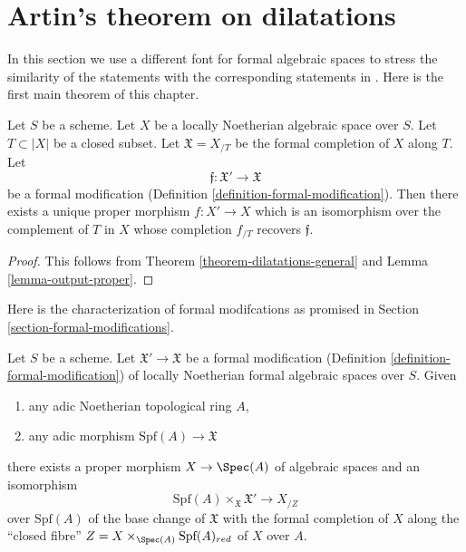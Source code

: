 \section{Artin's theorem on dilatations}
\label{section-dilatations}

\noindent
In this section we use a different font for formal algebraic spaces
to stress the similarity of the statements with the corresponding
statements in \cite{ArtinII}. Here is the first main theorem of this chapter.

\begin{theorem}
\label{theorem-dilatations}
\begin{reference}
\cite[Theorem 3.1]{ArtinII}
\end{reference}
Let $S$ be a scheme. Let $X$ be a locally Noetherian algebraic space over $S$.
Let $T \subset |X|$ be a closed subset. Let
$\mathfrak X = X_{/T}$
be the formal completion of $X$ along $T$. Let
$$
\mathfrak f : \mathfrak X' \to \mathfrak X
$$
be a formal modification (Definition \ref{definition-formal-modification}).
Then there exists a unique proper morphism $f : X' \to X$ which is an
isomorphism over the complement of $T$ in $X$ whose completion $f_{/T}$
recovers $\mathfrak f$. 
\end{theorem}

\begin{proof}
This follows from Theorem \ref{theorem-dilatations-general}
and Lemma \ref{lemma-output-proper}.
\end{proof}

\noindent
Here is the characterization of formal modifcations
as promised in Section \ref{section-formal-modifications}.

\begin{lemma}
\label{lemma-formal-modifications-locally-algebraic}
Let $S$ be a scheme. Let $\mathfrak X' \to \mathfrak X$
be a formal modification (Definition \ref{definition-formal-modification})
of locally Noetherian formal algebraic spaces over $S$. Given
\begin{enumerate}
\item any adic Noetherian topological ring $A$,
\item any adic morphism $\text{Spf}(A) \longrightarrow \mathfrak X$
\end{enumerate}
there exists a proper morphism $X \to \Spec(A)$ of algebraic spaces
and an isomorphism
$$
\text{Spf}(A) \times_{\mathfrak X} \mathfrak X'
\longrightarrow
X_{/Z}
$$
over $\text{Spf}(A)$ of the base change of $\mathfrak X$
with the formal completion of $X$ along the ``closed fibre''
$Z = X \times_{\Spec(A)} \text{Spf}(A)_{red}$ of $X$ over $A$.
\end{lemma}

